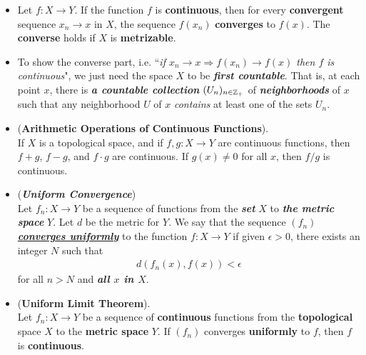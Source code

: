 \documentclass[11pt]{article}
\begin{document}
\begin{itemize}
\item \begin{proposition}
Let $f: X \rightarrow Y$. If the function $f$ is \textbf{continuous}, then for every \textbf{convergent} sequence $x_n \rightarrow x$ in $X$, the sequence $f(x_n)$ \textbf{converges} to $f(x)$. The \textbf{converse} holds if $X$ is \textbf{metrizable}.
\end{proposition}

\item \begin{remark}
To show the converse part, i.e. ``\emph{if $x_n \rightarrow x \Rightarrow f(x_n) \rightarrow f(x)$ then $f$ is continuous}", we just need the space $X$ to be \emph{\textbf{first countable}}. That is, at each point $x$, there is \emph{\textbf{a countable collection}} $(U_{n})_{n \in {\mathbb Z}_{+}}$ of \emph{\textbf{neighborhoods}} of $x$ such that any neighborhood $U$ of $x$ \emph{contains} at least one of the sets $U_n$.
\end{remark}

\item \begin{proposition} (\textbf{Arithmetic Operations of Continuous Functions}).\\
If $X$ is a topological space, and if $f, g : X \rightarrow Y$ are continuous functions, then $f + g$,  $f - g$, and $f \cdot g$ are continuous. If $g(x) \neq 0$ for all $x$, then $f/g$ is continuous.
\end{proposition}

\item \begin{definition} (\emph{\textbf{Uniform Convergence}})\\
Let $f_n : X \rightarrow Y$ be a sequence of functions from the \textbf{\emph{set}} $X$ to \emph{\textbf{the metric space}} $Y$. Let $d$ be the metric for $Y$. We say that the sequence $(f_n)$ \underline{\emph{\textbf{converges uniformly}}} to the function $f: X \rightarrow Y$ if given $\epsilon > 0$, there exists an integer $N$ such that
\begin{align*}
d(f_n(x), f(x)) < \epsilon
\end{align*}
for all $n > N$ and \textbf{\emph{all $x$ in $X$}}.
\end{definition}

\item \begin{theorem} (\textbf{Uniform Limit Theorem}). \citep{munkres2000topology}\\
Let $f_n : X \rightarrow Y$ be a sequence of  \textbf{continuous} functions from the \textbf{topological} space $X$ to the \textbf{metric space} $Y$. If $(f_n)$ converges
\textbf{uniformly} to $f$, then $f$ is \textbf{continuous}.
\end{theorem}


\end{itemize}
\end{document}

